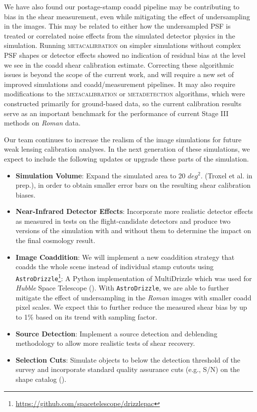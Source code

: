 \documentclass[fleqn,usenatbib]{mnras}
\begin{document}
We have also found our postage-stamp coadd pipeline may be contributing to bias in the shear measurement, even while mitigating the effect of undersampling in the images.  This may be related to either how the undersampled PSF is treated or correlated noise effects from the simulated detector physics in the simulation. Running \textsc{metacalirbation} on simpler simulations without complex PSF shapes or detector effects showed no indication of residual bias at the level we see in the coadd shear calibration estimate. Correcting these algorithmic issues is beyond the scope of the current work, and will require a new set of improved simulations and coadd/measurement pipelines. It may also require modifications to the \textsc{metacalibration} or \textsc{metadetection} algorithms, which were constructed primarily for ground-based data, so the current calibration results serve as an important benchmark for the performance of current Stage III methods on \emph{Roman} data.

Our team continues to increase the realism of the image simulations for future weak lensing calibration analyses. In the next generation of these simulations, we expect to include the following updates or upgrade these parts of the simulation. 
\begin{itemize}
    \setlength\itemsep{1em}
    \item \textbf{Simulation Volume}: Expand the simulated area to 20 $deg^{2}$. (Troxel et al. in prep.), in order to obtain smaller error bars on the resulting shear calibration biases. 
    
    \item \textbf{Near-Infrared Detector Effects}: Incorporate more realistic detector effects as measured in tests on the flight-candidate detectors and produce two versions of the simulation with and without them to determine the impact on the final cosmology result.
    
    \item \textbf{Image Coaddition}: We will implement a new coaddition strategy that coadds the whole scene instead of individual stamp cutouts using  \texttt{AstroDrizzle}\footnote{\url{https://github.com/spacetelescope/drizzlepac}}: A Python implementation of MultiDrizzle which was used for \emph{Hubble} Space Telescope (\citealt{2003hstc.conf..325B}). With \texttt{AstroDrizzle}, we are able to further mitigate the effect of undersampling in the \emph{Roman} images with smaller coadd pixel scales. We expect this to further reduce the measured shear bias by up to 1\% based on its trend with sampling factor.
    
    \item \textbf{Source Detection}: Implement a source detection and deblending methodology to allow more realistic tests of shear recovery.
    
    \item \textbf{Selection Cuts}: Simulate objects to below the detection threshold of the survey and incorporate standard quality assurance cuts (e.g., S/N) on the shape catalog (\citealt{2017ApJ...841...24S}). 
\end{itemize}
\end{document}
